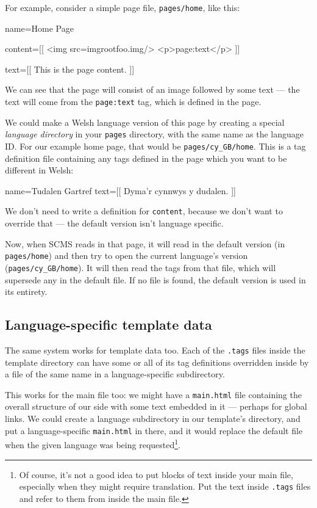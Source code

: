For example, consider a simple page file, \texttt{pages/home}, like this:
\begin{MyVerbatim}
name=Home Page

content=[[
<img src={{imgroot}}foo.img/>
<p>{{page:text}}</p>
]]

text=[[
This is the page content.
]]
\end{MyVerbatim}
We can see that the page will consist of an image followed by some text --- the text will come from the \texttt{page:text} tag, which is defined in the page.

We could make a Welsh language version of this page by creating a special
\emph{language directory} in your \texttt{pages} directory, with the same name
as the language ID. For our example home page, that would be
\texttt{pages/cy\_GB/home}. This is a tag definition file containing any tags
defined in the page which you want to be different in Welsh:
\begin{MyVerbatim}
name=Tudalen Gartref
text=[[
Dyma'r cynnwys y dudalen.
]]
\end{MyVerbatim}
We don't need to write a definition for \texttt{content}, because we don't want to override that --- the default version isn't language specific.

Now, when SCMS reads in that page, it will read in the default version (in
\texttt{pages/home}) and then try to open the current language's version
(\texttt{pages/cy\_GB/home}). It will then read the tags from that file, which
will supersede any in the default file. If no file is found, the default
version is used in its entirety.

\subsection{Language-specific template data}
The same system works for template data too. Each of the \texttt{.tags} files
inside the template directory can have some or all of its tag definitions
overridden inside by a file of the same name in a language-specific
subdirectory.

This works for the main file too: we might have a \texttt{main.html} file
containing the overall structure of our side with some text embedded in it ---
perhaps for global links. We could create a language subdirectory in our
template's directory, and put a language-specific \texttt{main.html} in there,
and it would replace the default file when the given language was being
requested\footnote{Of course, it's not a good idea to put blocks of text
inside your main file, especially when they might require translation. Put the
text inside \texttt{.tags} files and refer to them from inside the main
file.}.

